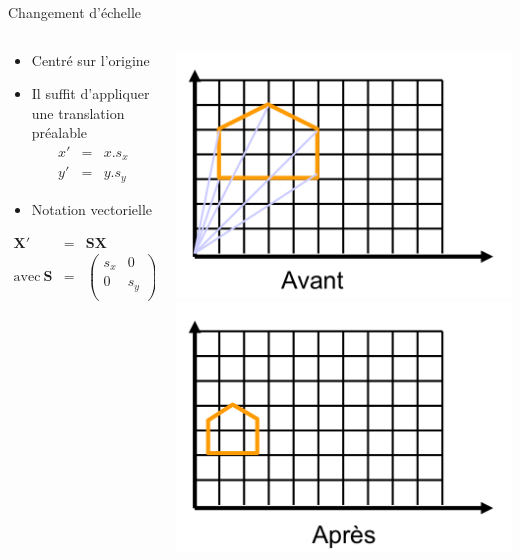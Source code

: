 \begin{frame}{Changement d'échelle}
\begin{columns}
\begin{column}{.6\textwidth}
\begin{itemize}
\item Centré sur l'origine
\item Il suffit d'appliquer une translation préalable
\begin{eqnarray*}
x' & = & x . s_x \\
y' & = & y . s_y
\end{eqnarray*}
\item Notation vectorielle
\end{itemize}
\begin{eqnarray*}
\mathbf{X'} & = & \mathbf{S}\mathbf{X} \\
\mathrm{avec}\  \mathbf{S} & = & \left(
\begin{array}{cc}
s_x & 0 \\
0 & s_y \\
\end{array}
\right)
\end{eqnarray*}
\end{column}
\begin{column}{.39\textwidth}
\begin{center}
\includegraphics[width=.7\textwidth]{figs/scale1.png} \\
\includegraphics[width=.7\textwidth]{figs/scale2.png} \\

\end{center}
\end{column}
\end{columns}
\end{frame}

